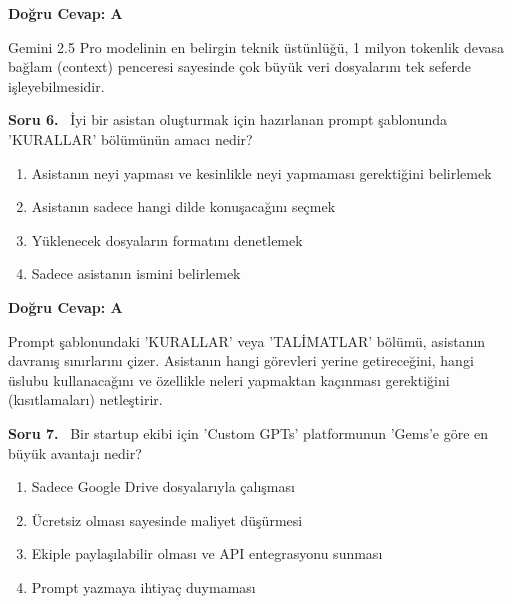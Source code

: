 \documentclass[11pt,a4paper,openany]{book}
\begin{document}
\vspace{4pt}
\begin{tcolorbox}[title=Cevap ve Açıklama, colback=gray!3!white, colframe=primarycolor!90!black, arc=2mm, fonttitle=\bfseries\sffamily, top=6pt, bottom=6pt]
    \textbf{Doğru Cevap: A}

    \vspace{2pt}
    Gemini 2.5 Pro modelinin en belirgin teknik üstünlüğü, 1 milyon tokenlik devasa bağlam (context) penceresi sayesinde çok büyük veri dosyalarını tek seferde işleyebilmesidir.
\end{tcolorbox}
\vspace{10pt}
\needspace{5cm}
\vspace{8pt}
\noindent\textbf{\large\sffamily Soru 6.} \ İyi bir asistan oluşturmak için hazırlanan prompt şablonunda 'KURALLAR' bölümünün amacı nedir?

\begin{enumerate}[label=\Alph*), leftmargin=25pt, topsep=4pt, itemsep=2pt]
        \item Asistanın neyi yapması ve kesinlikle neyi yapmaması gerektiğini belirlemek
        \item Asistanın sadece hangi dilde konuşacağını seçmek
        \item Yüklenecek dosyaların formatını denetlemek
        \item Sadece asistanın ismini belirlemek
\end{enumerate}

\vspace{4pt}
\begin{tcolorbox}[title=Cevap ve Açıklama, colback=gray!3!white, colframe=primarycolor!90!black, arc=2mm, fonttitle=\bfseries\sffamily, top=6pt, bottom=6pt]
    \textbf{Doğru Cevap: A}

    \vspace{2pt}
    Prompt şablonundaki 'KURALLAR' veya 'TALİMATLAR' bölümü, asistanın davranış sınırlarını çizer. Asistanın hangi görevleri yerine getireceğini, hangi üslubu kullanacağını ve özellikle neleri yapmaktan kaçınması gerektiğini (kısıtlamaları) netleştirir.
\end{tcolorbox}
\vspace{10pt}
\needspace{5cm}
\vspace{8pt}
\noindent\textbf{\large\sffamily Soru 7.} \ Bir startup ekibi için 'Custom GPTs' platformunun 'Gems'e göre en büyük avantajı nedir?

\begin{enumerate}[label=\Alph*), leftmargin=25pt, topsep=4pt, itemsep=2pt]
        \item Sadece Google Drive dosyalarıyla çalışması
        \item Ücretsiz olması sayesinde maliyet düşürmesi
        \item Ekiple paylaşılabilir olması ve API entegrasyonu sunması
        \item Prompt yazmaya ihtiyaç duymaması
\end{enumerate}
\end{document}
